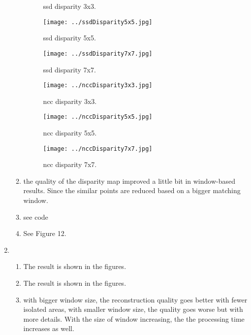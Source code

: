 \documentclass[a4paper, twoside, english]{article}
\begin{document}
\begin{enumerate}
\begin{enumerate}
\begin{figure}[h!]
\begin{minipage}[b]{0.3\textwidth}
				\caption{ssd disparity 3x3.}
			\end{minipage}
			\hfill
			\begin{minipage}[b]{0.3\textwidth}
				\texttt{[image: ../ssdDisparity5x5.jpg]}
				\caption{ssd disparity 5x5.}
			\end{minipage}
			\hfill
			\begin{minipage}[b]{0.3\textwidth}
				\texttt{[image: ../ssdDisparity7x7.jpg]}
				\caption{ssd disparity 7x7.}
			\end{minipage}
			\hfill
			\begin{minipage}[b]{0.3\textwidth}
				\texttt{[image: ../nccDisparity3x3.jpg]}
				\caption{ncc disparity 3x3.}
			\end{minipage}
			\hfill
			\begin{minipage}[b]{0.3\textwidth}
				\texttt{[image: ../nccDisparity5x5.jpg]}
				\caption{ncc disparity 5x5.}
			\end{minipage}
			\hfill
			\begin{minipage}[b]{0.3\textwidth}
				\texttt{[image: ../nccDisparity7x7.jpg]}
				\caption{ncc disparity 7x7.}
			\end{minipage}
			\hfill
		\end{figure} 
		\item the quality of the disparity map improved a little bit in window-based results. Since the similar points are reduced based on a bigger matching window.
		\item see code
		\item See Figure 12.
	\end{enumerate}
	
	\item 
	\begin{enumerate}
		\item The result is shown in the figures.
		\item The result is shown in the figures.
		\item with bigger window size, the reconstruction quality goes better with fewer isolated areas, with smaller window size, the quality goes worse but with more details. With the size of window increasing, the the processing time increases as well.
	\end{enumerate} 
\end{enumerate}



\newpage
\end{document}
